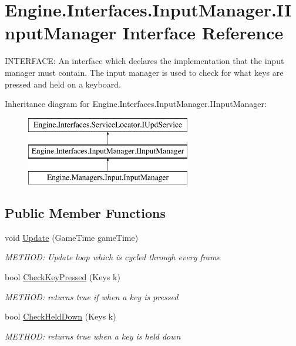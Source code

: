 \hypertarget{a00450}{}\section{Engine.\+Interfaces.\+Input\+Manager.\+I\+Input\+Manager Interface Reference}
\label{a00450}


I\+N\+T\+E\+R\+F\+A\+CE\+: An interface which declares the implementation that the input manager must contain. The input manager is used to check for what keys are pressed and held on a keyboard.  


Inheritance diagram for Engine.\+Interfaces.\+Input\+Manager.\+I\+Input\+Manager\+:\begin{figure}[H]
\begin{center}
\leavevmode
\includegraphics[height=3.000000cm]{de/df4/a00450}
\end{center}
\end{figure}
\subsection*{Public Member Functions}
\begin{DoxyCompactItemize}
\item 
void \hyperlink{a00450_a43c99a0052fd196583700113cd0bdf9f}{Update} (Game\+Time game\+Time)
\begin{DoxyCompactList}\small\item\em M\+E\+T\+H\+OD\+: Update loop which is cycled through every frame \end{DoxyCompactList}\item 
bool \hyperlink{a00450_ab31bc2c7a5da56dc4a46ac378fde0590}{Check\+Key\+Pressed} (Keys k)
\begin{DoxyCompactList}\small\item\em M\+E\+T\+H\+OD\+: returns true if when a key is pressed \end{DoxyCompactList}\item 
bool \hyperlink{a00450_a661496081120efdcd653693977f36fd9}{Check\+Held\+Down} (Keys k)
\begin{DoxyCompactList}\small\item\em M\+E\+T\+H\+OD\+: returns true when a key is held down \end{DoxyCompactList}\end{DoxyCompactItemize}



